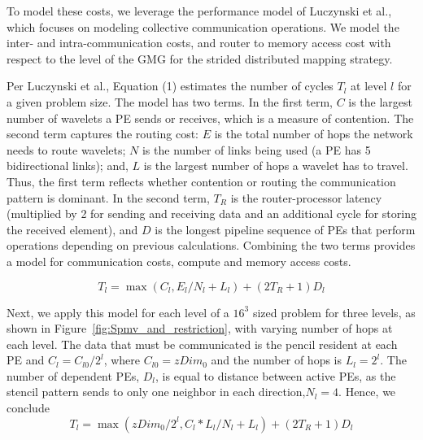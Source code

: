 \documentclass[conference]{IEEEtran}
\begin{document}
            To model these costs, we leverage the performance model of Luczynski et al.\cite{luczynski_reduce}, which focuses on modeling collective communication operations. We model the inter- and intra-communication costs, and router to memory access cost with respect to the level of the GMG for the strided distributed mapping strategy.

            Per Luczynski et al., Equation (1) %
            estimates the number of cycles \(T_l\) at level \(l\) for a given problem size. The model has two terms. In the first term, \(C\) is the largest number of wavelets a PE sends or receives, which is a measure of contention. The second term captures the routing cost: \(E\) is the total number of hops the network needs to route wavelets; \(N\) is the number of links being used (a PE has 5 bidirectional links); and, \(L\) is the largest number of hops a wavelet has to travel.  Thus, the first term reflects whether contention or routing the communication pattern is dominant. In the second term, \(T_R\) is the router-processor latency (multiplied by 2 for sending and receiving data and an additional cycle for storing the received element), and \(D\) is the longest pipeline sequence of PEs that perform operations depending on previous calculations.  Combining the two terms provides a model for communication costs, compute and memory access costs.

            \begin{equation}\label{eq:comm_model}
                T_l = \max \left( C_l, E_l / N_l + L_l \right) + (2 T_R + 1) D_l
            \end{equation}

            Next, we apply this model for each level of a \(16^3\) sized problem for three levels, as shown in Figure~\ref{fig:Spmv_and_restriction}, with varying number of hops at each level. The data that must be communicated is the pencil resident at each PE and \(C_l = C_{l0}/2^l\), where \(C_{l0}=zDim_0\) and the number of hops %
            is \(L_l = 2^l\). The number of dependent PEs, \(D_l\), is equal to distance between active PEs, as the stencil pattern sends to only one neighbor in each direction,\(N_l = 4\). Hence, we conclude
            \begin{equation}
                T_l = \max \left( zDim_0/2^l, C_l*L_l / N_l + L_l \right) + (2 T_R + 1) D_l
                \label{eq:comm_model_applied}
            \end{equation}
\end{document}
